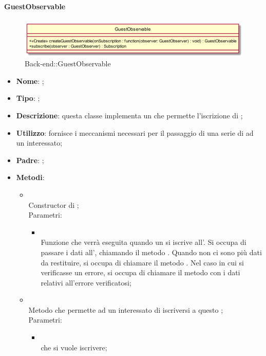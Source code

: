\hypertarget{GuestObservable_label}{\paragraph{GuestObservable}}
\begin{figure}[h]
	\centering
	\includegraphics[width=\textwidth,height=\textheight,keepaspectratio]{images/ClassGuestObservable.png}
	\caption{Back-end::GuestObservable}
\end{figure}
\begin{itemize}
	\item \textbf{Nome}: ;
	\item \textbf{Tipo}: ;
	\item \textbf{Descrizione}: questa classe implementa un  che permette l'iscrizione di ;
	\item \textbf{Utilizzo}: fornisce i meccanismi necessari per il passaggio di una serie di  ad un  interessato;
	\item \textbf{Padre}: ;
	\item \textbf{Metodi}:
	\begin{itemize}
		\item[]  \\
		Constructor di ;\\
		Parametri:
		\begin{itemize}
			\item {} \\
			Funzione che verrà eseguita quando un  si iscrive all'. Si occupa di passare i dati all', chiamando il metodo . Quando non ci sono più dati da restituire, si occupa di chiamare il metodo . Nel caso in cui si verificasse un errore, si occupa di chiamare il metodo  con i dati relativi all'errore verificatosi;
		\end{itemize}
		\item[]  \\
		Metodo che permette ad un  interessato di iscriversi a questo ;\\
		Parametri:
		\begin{itemize}
			\item {} \\
			 che si vuole iscrivere;
		\end{itemize}
	\end{itemize}
\end{itemize}

